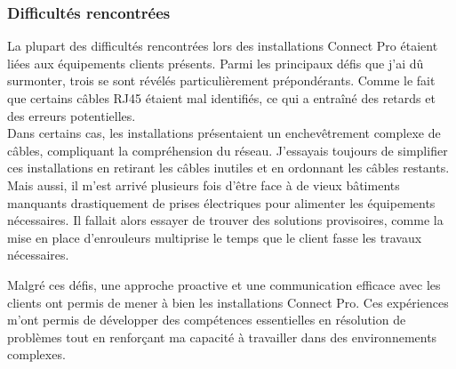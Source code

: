 \documentclass[12pt, a4paper]{article}
\begin{document}
\subsubsection{Difficultés rencontrées}
La plupart des difficultés rencontrées lors des installations
Connect Pro étaient liées aux équipements clients présents.
Parmi les principaux défis que j'ai dû surmonter,
trois se sont révélés particulièrement prépondérants. 
Comme le fait que certains câbles RJ45 étaient mal identifiés, ce qui a entraîné
des retards et des erreurs potentielles.\\

Dans certains cas, les installations présentaient un enchevêtrement
complexe de câbles, compliquant la compréhension du réseau.
J'essayais toujours de simplifier ces installations en retirant les câbles
inutiles et en ordonnant les câbles restants.\\

Mais aussi, il m'est arrivé plusieurs fois d'être face à de vieux bâtiments 
manquants drastiquement de prises électriques pour alimenter les équipements
nécessaires. Il fallait alors essayer de trouver des solutions 
provisoires, comme la mise en 
place d'enrouleurs multiprise le temps que le client fasse les travaux nécessaires. 

Malgré ces défis, une approche proactive et une communication efficace
avec les clients ont permis de mener à
bien les installations Connect Pro. Ces
expériences m'ont permis de développer des compétences essentielles
en résolution de problèmes tout en
renforçant ma capacité à travailler dans des environnements complexes.



\newpage
\end{document}
